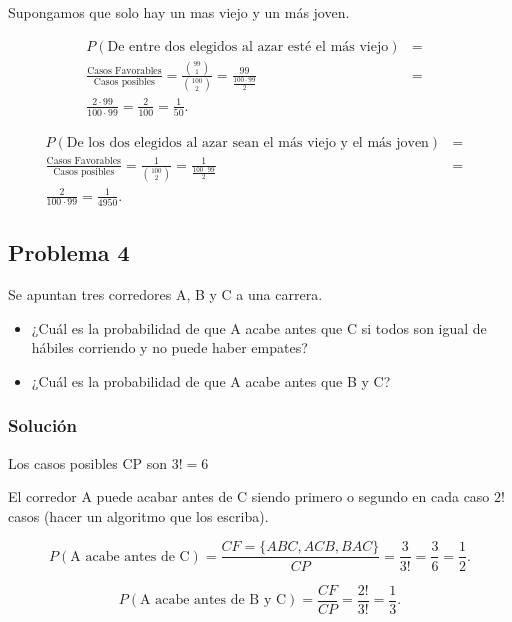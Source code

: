 \documentclass[
]{article}
\providecommand{\tightlist}{%
  \setlength{\itemsep}{0pt}\setlength{\parskip}{0pt}}
\begin{document}
Supongamos que solo hay un mas viejo y un más joven.

\begin{eqnarray*}
P(\mbox{De entre dos elegidos al azar esté el más viejo}) &=&\\
\frac{\mbox{Casos Favorables}}{\mbox{Casos posibles}}=
\frac{{{99}\choose {1}}}{{{100}\choose {2}}}=\frac{99}{\frac{100\cdot 99}{2}}&=&\\
\frac{2\cdot 99}{100\cdot 99}=
\frac{2}{100}=\frac{1}{50}.
\end{eqnarray*}

\begin{eqnarray*}
P(\mbox{De los dos elegidos al azar sean  el más viejo y el más joven})&=&\\
\frac{\mbox{Casos Favorables}}{\mbox{Casos posibles}}=
\frac{1}{{{100} \choose {2}}}=\frac{1}{\frac{100\cdot 99}{2}}&=&\\
\frac{2}{100\cdot 99}
=\frac{1}{4950}.
\end{eqnarray*}

\hypertarget{problema-4}{%
\subsection{Problema 4}\label{problema-4}}

Se apuntan tres corredores A, B y C a una carrera.

\begin{itemize}
\tightlist
\item
  ¿Cuál es la probabilidad de que A acabe antes que C si todos son igual
  de hábiles corriendo y no puede haber empates?
\item
  ¿Cuál es la probabilidad de que A acabe antes que B y C?
\end{itemize}

\hypertarget{soluciuxf3n-4}{%
\subsubsection{Solución}\label{soluciuxf3n-4}}

Los casos posibles CP son \(3!=6\)

El corredor A puede acabar antes de C siendo primero o segundo en cada
caso \(2!\) casos (hacer un algoritmo que los escriba).

\[P(\mbox{A acabe antes de C})=\frac{CF= \{ABC,ACB,BAC\}}{CP}=\frac{3}{3!}=\frac{3}{6}=\frac{1}{2}.\]

\[P(\mbox{A acabe antes de B y C})=\frac{CF}{CP}=\frac{2!}{3!}=\frac{1}{3}.\]
\end{document}
